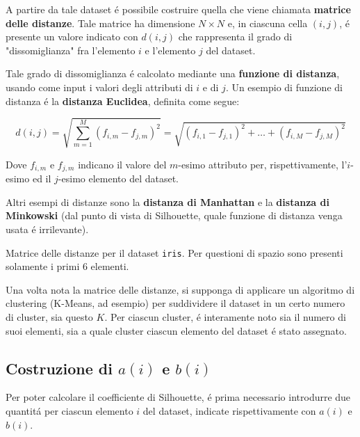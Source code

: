 \documentclass[italian]{article}
\begin{document}
		A partire da tale dataset é possibile costruire quella che viene
		chiamata \textbf{matrice delle distanze}. Tale matrice ha dimensione
		$N \times N$ e, in ciascuna cella $(i, j)$, é presente un valore
		indicato con $d(i, j)$ che rappresenta il grado di "dissomiglianza"
		fra l'elemento $i$ e l'elemento $j$ del dataset.

		Tale grado di dissomiglianza é calcolato mediante una
		\textbf{funzione di distanza}, usando come input i valori
		degli attributi di $i$ e di $j$. Un esempio di funzione di
		distanza é la \textbf{distanza Euclidea}, definita come segue:

		\begin{equation}
			d(i, j) =
			\sqrt{\sum_{m = 1}^{M} (f_{i, m} - f_{j, m})^{2}} =
			\sqrt{(f_{i, 1} - f_{j, 1})^{2} + \dots +
			      (f_{i, M} - f_{j, M})^{2}}
		\end{equation}

		Dove $f_{i, m}$ e $f_{j, m}$ indicano il valore del $m$-esimo
		attributo per, rispettivamente, l'$i$-esimo ed il $j$-esimo
		elemento del dataset.

		Altri esempi di distanze sono la \textbf{distanza di Manhattan}
		e la \textbf{distanza di Minkowski} (dal punto di vista di
		Silhouette, quale funzione di distanza venga usata é irrilevante).

		\begin{table}[h]
			\centering
			\caption{Matrice delle distanze per il dataset \texttt{iris}. Per questioni
			di spazio sono presenti solamente i primi 6 elementi.}
			\label{tab:dist}
		\end{table}

		Una volta nota la matrice delle distanze, si supponga di applicare
		un algoritmo di clustering (K-Means, ad esempio) per suddividere il
		dataset in un certo numero di cluster, sia questo $K$. Per ciascun
		cluster, é interamente noto sia il numero di suoi elementi, sia
		a quale cluster ciascun elemento del dataset é stato assegnato.

	\subsection{Costruzione di $a(i)$ e $b(i)$}

		Per poter calcolare il coefficiente di Silhouette, é prima necessario
		introdurre due quantitá per ciascun elemento $i$ del dataset, indicate
		rispettivamente con $a(i)$ e $b(i)$.
\end{document}
